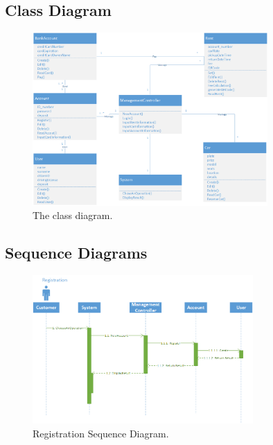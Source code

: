 \documentclass{article}
\begin{document}
    \newpage
    \subsection{Class Diagram}
        \begin{figure}[h]
            \centering
            \includegraphics[width=0.8\textwidth]{img/ClassDiagram.png}
            \caption{The class diagram.}
            \label{fig:classDiagram}
        \end{figure}
    \newpage
    \subsection{Sequence Diagrams}
        \begin{figure}[h]
            \centering
            \includegraphics[width=0.75\textwidth]{img/SequenceDiagramRegistration.png}
            \caption{Registration Sequence Diagram.}
            \label{fig:sequenceDiagramRegistration}
        \end{figure}
        
\end{document}
